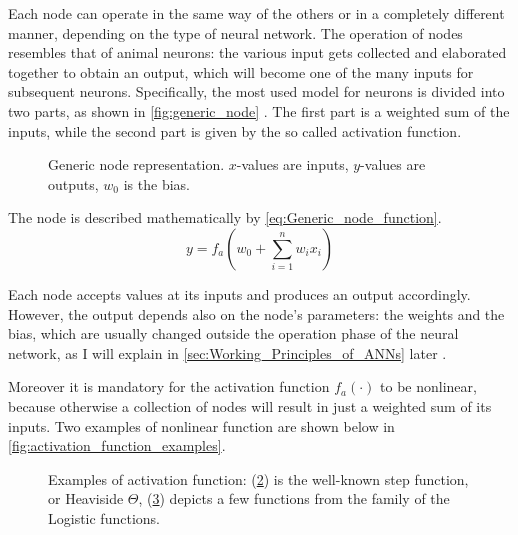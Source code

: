 Each node can operate in the same way of the others or in a completely different manner, depending on the type of neural network.
The operation of nodes resembles that of animal neurons: the various input gets collected and elaborated together to obtain an output, which will become one of the many inputs for subsequent neurons.
Specifically, the most used model for neurons is divided into two parts, as shown in \autoref{fig:generic_node} .
The first part is a weighted sum of the inputs, while the second part is given by the so called activation function.

\begin{figure}[ht]
	\centering
	
	\caption{Generic node representation. $x$-values are inputs, $y$-values are outputs, $w_0$ is the bias.}
	\label{fig:generic_node}
\end{figure}
The node is described mathematically by \autoref{eq:Generic_node_function}.
\begin{equation}
y = f_a \left(  w_0 + \sum_{i=1}^{n} w_i x_i \right)
\label{eq:Generic_node_function}
\end{equation}

Each node accepts values at its inputs and produces an output accordingly.
However, the output depends also on the node's parameters: the weights and the bias, which are usually changed outside the operation phase of the neural network, as I will explain in \autoref{sec:Working_Principles_of_ANNs} later .

Moreover it is mandatory for the activation function $f_a\left(\cdot\right)$ to be nonlinear, because otherwise a collection of nodes will result in just a weighted sum of its inputs.
Two examples of nonlinear function are shown below in \autoref{fig:activation_function_examples}.

\begin{figure}[ht]
	\begin{subfigure}[b]{0.49\textwidth}
		\centering
		
		\caption{}
		\label{fig:activation_function_example_1}
  \end{subfigure}
  \begin{subfigure}[b]{0.49\textwidth}
  		\centering
		
		\caption{}
		\label{fig:activation_function_example_2}
  \end{subfigure}
  \caption{Examples of activation function: (\ref{fig:activation_function_example_1}) is the well-known step function, or Heaviside $\Theta$, (\ref{fig:activation_function_example_2}) depicts a few functions from the family of the Logistic functions.}
  	\label{fig:activation_function_examples}
\end{figure}

